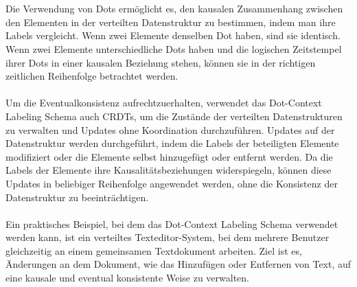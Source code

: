 \\\\
Die Verwendung von Dots ermöglicht es, den kausalen Zusammenhang zwischen den Elementen in der verteilten Datenstruktur zu bestimmen, indem man ihre Labels vergleicht. Wenn zwei Elemente denselben Dot haben, sind sie identisch. Wenn zwei Elemente unterschiedliche Dots haben und die logischen Zeitstempel ihrer Dots in einer kausalen Beziehung stehen, können sie in der richtigen zeitlichen Reihenfolge betrachtet werden.
\\\\
Um die Eventualkonsistenz aufrechtzuerhalten, verwendet das Dot-Context Labeling Schema auch CRDTs, um die Zustände der verteilten Datenstrukturen zu verwalten und Updates ohne Koordination durchzuführen. Updates auf der Datenstruktur werden durchgeführt, indem die Labels der beteiligten Elemente modifiziert oder die Elemente selbst hinzugefügt oder entfernt werden. Da die Labels der Elemente ihre Kausalitätsbeziehungen widerspiegeln, können diese Updates in beliebiger Reihenfolge angewendet werden, ohne die Konsistenz der Datenstruktur zu beeinträchtigen.
\\\\
Ein praktisches Beispiel, bei dem das Dot-Context Labeling Schema verwendet werden kann, ist ein verteiltes Texteditor-System, bei dem mehrere Benutzer gleichzeitig an einem gemeinsamen Textdokument arbeiten. Ziel ist es, Änderungen an dem Dokument, wie das Hinzufügen oder Entfernen von Text, auf eine kausale und eventual konsistente Weise zu verwalten.
